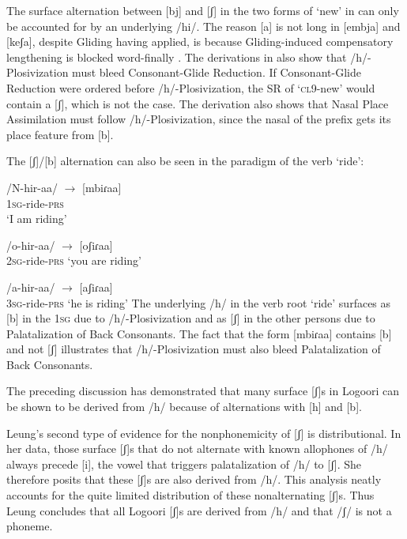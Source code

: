 \documentclass[output=paper]{langsci/langscibook}
\begin{document}
The surface alternation between [bj] and [ʃ] in the two forms of ‘new’ in  can only be accounted for by an underlying /hi/. The reason [a] is not long in [embja] and [keʃa], despite Gliding having applied, is because Gliding-induced compensatory lengthening is blocked word-finally \citep{Leung1991}. The derivations in  also show that /h/-Plosivization must bleed Consonant-Glide Reduction. If Consonant-Glide Reduction were ordered before /h/-Plosivization, the SR of ‘\textsc{cl}9-new’ would contain a [ʃ], which is not the case. The derivation also shows that Nasal Place Assimilation must follow /h/-Plosivization, since the nasal of the prefix gets its place feature from [b].

The [ʃ]/[b] alternation can also be seen in the paradigm of the verb ‘ride’:


\ea\label{ex:glewwe:18}{}
   \ea\label{ex:glewwe:18a}
 /N-hir-aa/  $\rightarrow$  [mbiɾaa]\\{}
\textsc{1sg}-ride-\textsc{prs}\\{}
\glt ‘I am riding’

\ex\label{ex:glewwe:18b}{}
 /o-hir-aa/  $\rightarrow$  \textsc{[}oʃiɾaa]\\{}
\textsc{2sg}-ride-\textsc{prs}
\glt ‘you are riding’  

\ex\label{ex:glewwe:18c}{}
 /a-hir-aa/  $\rightarrow$  [aʃiɾaa]  \\{}
\textsc{3sg}-ride-\textsc{prs}
\glt ‘he is riding’
\z
\z 
The underlying /h/ in the verb root ‘ride’ surfaces as [b] in the 1\textsc{sg} due to /h/-Plosivization and as [ʃ] in the other persons due to Palatalization of Back Consonants. The fact that the form [mbiɾaa] contains [b] and not [ʃ] illustrates that /h/-Plosivization must also bleed Palatalization of Back Consonants. 

The preceding discussion has demonstrated that many surface [ʃ]s in Logoori can be shown to be derived from /h/ because of alternations with [h] and [b]. 

Leung’s second type of evidence for the nonphonemicity of [ʃ] is distributional. In her data, those surface [ʃ]s that do not alternate with known allophones of /h/ always precede [i], the vowel that triggers palatalization of /h/ to [ʃ]. She therefore posits that these [ʃ]s are also derived from /h/. This analysis neatly accounts for the quite limited distribution of these nonalternating [ʃ]s. Thus Leung concludes that all Logoori [ʃ]s are derived from /h/ and that /ʃ/ is not a phoneme.
\end{document}
